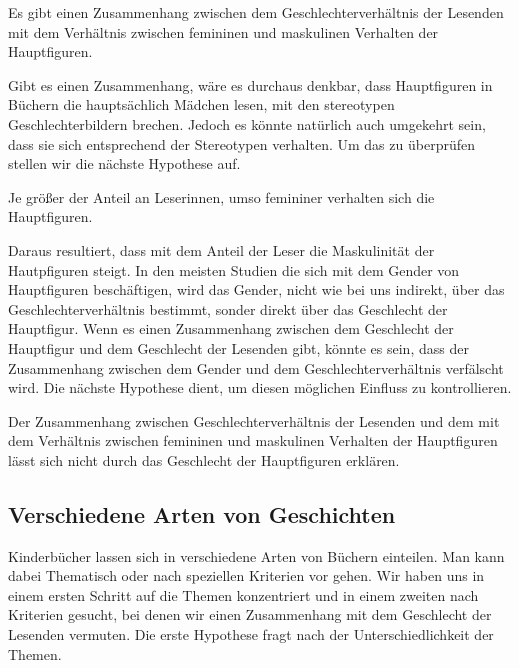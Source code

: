 \begin{hyp}\label{h3}
   Es gibt einen Zusammenhang zwischen dem Geschlechterverhältnis der Lesenden
    mit  dem Verhältnis zwischen femininen und maskulinen Verhalten der Hauptfiguren.
\end{hyp}

Gibt es einen Zusammenhang, wäre es durchaus denkbar, dass Hauptfiguren
in Büchern die hauptsächlich Mädchen lesen, mit den stereotypen
Geschlechterbildern brechen. Jedoch es könnte natürlich auch umgekehrt
sein, dass sie sich entsprechend der Stereotypen verhalten. Um das zu
überprüfen stellen wir die nächste Hypothese auf.

\begin{subhyp}\label{h3.1}
    Je größer der Anteil an Leserinnen, umso femininer verhalten sich die Hauptfiguren.
\end{subhyp}

Daraus resultiert, dass mit dem Anteil der Leser die Maskulinität der
Hautpfiguren steigt. In den meisten Studien die sich mit dem Gender von
Hauptfiguren beschäftigen, wird das Gender, nicht wie bei uns indirekt,
über das Geschlechterverhältnis bestimmt, sonder direkt über das
Geschlecht der Hauptfigur. Wenn es einen Zusammenhang zwischen dem
Geschlecht der Hauptfigur und dem Geschlecht der Lesenden gibt, könnte
es sein, dass der Zusammenhang zwischen dem Gender und dem
Geschlechterverhältnis verfälscht wird. Die nächste Hypothese dient, um
diesen möglichen Einfluss zu kontrollieren.

\begin{subhyp}\label{h3.2}
    Der Zusammenhang zwischen Geschlechterverhältnis der Lesenden und dem
    mit dem Verhältnis zwischen femininen und maskulinen Verhalten der Hauptfiguren lässt sich nicht durch das Geschlecht der Hauptfiguren erklären.
\end{subhyp}

\subsection{Verschiedene Arten von Geschichten}

Kinderbücher lassen sich in verschiedene Arten von Büchern einteilen.
Man kann dabei Thematisch oder nach speziellen Kriterien vor gehen. Wir
haben uns in einem ersten Schritt auf die Themen konzentriert und in
einem zweiten nach Kriterien gesucht, bei denen wir einen Zusammenhang
mit dem Geschlecht der Lesenden vermuten. Die erste Hypothese fragt nach
der Unterschiedlichkeit der Themen.

